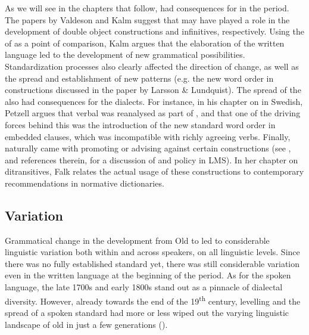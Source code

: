 \documentclass[output=paper]{langscibook}
\begin{document}
As we will see in the chapters that follow,  had consequences for  in the  period. The papers by Valdeson and Kalm suggest that  may have played a role in the development of double object constructions and  infinitives, respectively. Using the  of  as a point of comparison, Kalm argues that the elaboration of the written language led to the development of new grammatical possibilities. Standardization processes also clearly affected the direction of change, as well as the spread and establishment of new patterns (e.g. the new word order in  constructions discussed in the paper by Larsson \& Lundquist). The spread of the  also had consequences for the dialects. For instance, in his chapter on  in  Swedish, Petzell argues that verbal  was reanalysed as part of , and that one of the driving forces behind this  was the introduction of the new standard word order in embedded clauses, which was incompatible with richly agreeing verbs. Finally,  naturally came with  promoting or advising against certain constructions (see \citealt{Teleman2002, Teleman2003Tradis}, and references therein, for a discussion of  and policy in LMS). In her chapter on  ditransitives, Falk relates the actual usage of these constructions to contemporary recommendations in normative dictionaries. 


\subsection{Variation}\label{sec:intro:2.2}


Grammatical change in the development from Old to  led to considerable linguistic variation both within and across speakers, on all linguistic levels. Since there was no fully established standard yet, there was still considerable variation even in the written language at the beginning of the  period. As for the spoken language, the late 1700s and early 1800s stand out as a pinnacle of dialectal diversity. However, already towards the end of the 19\textsuperscript{th} century,  levelling and the spread of a spoken standard had more or less wiped out the varying linguistic landscape of old in just a few generations (\citealt{NilssonPetzell2015}).
\end{document}
